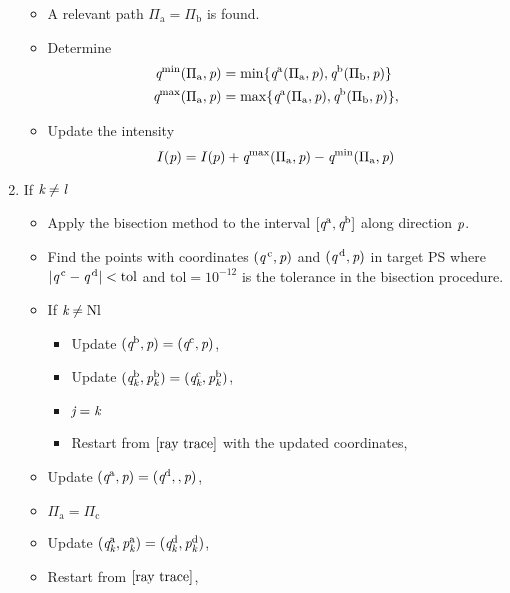 \begin{enumerate}
\begin{itemize}
\item A relevant path $\Pi_{\textrm{a}} = \Pi_{\textrm{b}}$ is found. 
\item Determine 
\begin{equation*}
\begin{aligned}
\textit{q}^{\textrm{min}}(\Pi_{\textrm{a}}, \textit{p})&=\min\{\textit{q}^{\textrm{a}}(\Pi_{\textrm{a}}, \textit{p}), \textit{q}^{\textrm{b}}(\Pi_{\textrm{b}}, \textit{p})\}\\ 
\textit{q}^{\textrm{max}}(\Pi_{\textrm{a}}, \textit{p})&=\max\{\textit{q}^{\textrm{a}}(\Pi_{\textrm{a}}, \textit{p}), \textit{q}^{\textrm{b}}(\Pi_{\textrm{b}}, \textit{p})\},
\end{aligned}
\end{equation*}
\item Update the intensity $$I(\textit{p}) = I(p)+\textit{q}^{\textrm{max}}(\Pi_{\textrm{a}}, \textit{p})-\textit{q}^{\textrm{min}}(\Pi_{\textrm{a}}, \textit{p})$$
\end{itemize}
\item If $\textit{k}\neq\textit{l}$ 
\begin{itemize}
\item Apply the bisection method to the interval $[\textit{q}^{\textrm{a}}, \textit{q}^{\textrm{b}}]$ along direction $\textit{p}$.
\item Find the points with coordinates $(\textit{q}^{\,\textrm{c}}, \textit{p})$ and $(\textit{q}^{\,\textrm{d}}, \textit{p})$ in target PS  where $|\textit{q}^{\,\textrm{c}}-\textit{q}^{\,\textrm{d}}|<\textrm{tol}$ and $\textrm{tol}=10^{-12}$ is the tolerance in the bisection procedure. 
\item If $\textit{k}\neq\textrm{Nl}$
\begin{itemize}
\item Update $(\textit{q}^{\textrm{b}}, \textit{p}) = (\textit{q}^{\textrm{c}}, \textit{p})$,
\item Update $(\textit{q}_{\textit{k}}^{\textrm{b}}, \textit{p}_{\textit{k}}^{\textrm{b}}) = (\textit{q}_{\textit{k}}^{\textrm{c}}, \textit{p}_{\textit{k}}^{\textrm{b}})$,

\item $\textit{j} = \textit{k}$

\item Restart from $\ref{ray trace}$ with the updated coordinates,
\end{itemize}
\item Update $(\textit{q}^{\textrm{a}}, \textit{p} )= (\textit{q}^{\textrm{d}}, , \textit{p})$,
\item $\Pi_{\textrm{a}} = \Pi_{\textrm{c}}$
\item Update $(\textit{q}_{\textit{k}}^{\textrm{a}}, \textit{p}_{\textit{k}}^{\textrm{a}}) = (\textit{q}_{\textit{k}}^{\textrm{d}}, \textit{p}_{\textit{k}}^{\textrm{d}})$,
\item Restart from $\ref{ray trace}$, 


\end{itemize}
\end{enumerate}
